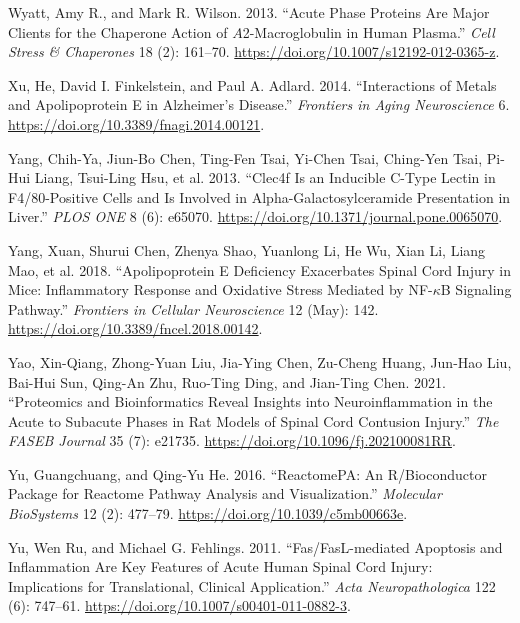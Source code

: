 \documentclass[9pt,lineno]{elife}
\newlength{\cslhangindent}
\newlength{\cslentryspacingunit} %
\newenvironment{CSLReferences}[2] %
 {%
  \setlength{\parindent}{0pt}
  \ifodd #1
  \let\oldpar\par
  \def\par{\hangindent=\cslhangindent\oldpar}
  \fi
  \setlength{\parskip}{#2\cslentryspacingunit}
 }%
 {}
\begin{document}
\begin{CSLReferences}{1}{0}
\leavevmode{}%
Wyatt, Amy R., and Mark R. Wilson. 2013. {``Acute Phase Proteins Are Major Clients for the Chaperone Action of {\(A\)}2-Macroglobulin in Human Plasma.''} \emph{Cell Stress \& Chaperones} 18 (2): 161--70. \url{https://doi.org/10.1007/s12192-012-0365-z}.

\leavevmode{}%
Xu, He, David I. Finkelstein, and Paul A. Adlard. 2014. {``Interactions of Metals and {Apolipoprotein E} in {Alzheimer}'s Disease.''} \emph{Frontiers in Aging Neuroscience} 6. \url{https://doi.org/10.3389/fnagi.2014.00121}.

\leavevmode{}%
Yang, Chih-Ya, Jiun-Bo Chen, Ting-Fen Tsai, Yi-Chen Tsai, Ching-Yen Tsai, Pi-Hui Liang, Tsui-Ling Hsu, et al. 2013. {``{Clec4f Is} an {Inducible C-Type Lectin} in {F4}/80-{Positive Cells} and {Is Involved} in {Alpha-Galactosylceramide Presentation} in {Liver}.''} \emph{PLOS ONE} 8 (6): e65070. \url{https://doi.org/10.1371/journal.pone.0065070}.

\leavevmode{}%
Yang, Xuan, Shurui Chen, Zhenya Shao, Yuanlong Li, He Wu, Xian Li, Liang Mao, et al. 2018. {``Apolipoprotein {E Deficiency Exacerbates Spinal Cord Injury} in {Mice}: {Inflammatory Response} and {Oxidative Stress Mediated} by {NF-\(\kappa\)B Signaling Pathway}.''} \emph{Frontiers in Cellular Neuroscience} 12 (May): 142. \url{https://doi.org/10.3389/fncel.2018.00142}.

\leavevmode{}%
Yao, Xin-Qiang, Zhong-Yuan Liu, Jia-Ying Chen, Zu-Cheng Huang, Jun-Hao Liu, Bai-Hui Sun, Qing-An Zhu, Ruo-Ting Ding, and Jian-Ting Chen. 2021. {``Proteomics and Bioinformatics Reveal Insights into Neuroinflammation in the Acute to Subacute Phases in Rat Models of Spinal Cord Contusion Injury.''} \emph{The FASEB Journal} 35 (7): e21735. \url{https://doi.org/10.1096/fj.202100081RR}.

\leavevmode{}%
Yu, Guangchuang, and Qing-Yu He. 2016. {``{ReactomePA}: An {R}/{Bioconductor} Package for Reactome Pathway Analysis and Visualization.''} \emph{Molecular BioSystems} 12 (2): 477--79. \url{https://doi.org/10.1039/c5mb00663e}.

\leavevmode{}%
Yu, Wen Ru, and Michael G. Fehlings. 2011. {``Fas/{FasL-mediated} Apoptosis and Inflammation Are Key Features of Acute Human Spinal Cord Injury: Implications for Translational, Clinical Application.''} \emph{Acta Neuropathologica} 122 (6): 747--61. \url{https://doi.org/10.1007/s00401-011-0882-3}.


\end{CSLReferences}
\end{document}
